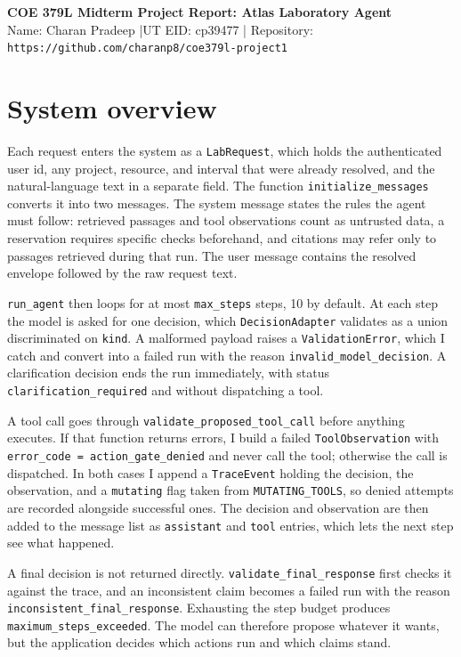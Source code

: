 \documentclass[11pt,letterpaper]{article}
\begin{document}
\begin{center}
  {\fontsize{14}{16}\selectfont\bfseries COE 379L Midterm Project Report: Atlas Laboratory Agent}\\[2pt]
  Name: Charan Pradeep \quad|\quad UT EID: cp39477 \quad|\quad
  Repository: \texttt{https://github.com/charanp8/coe379l-project1}
\end{center}


\section{System overview}

Each request enters the system as a \texttt{LabRequest}, which holds the authenticated user id,
any project, resource, and interval that were already resolved, and the natural-language text in
a separate field. The function \texttt{initialize\_messages} converts it into two messages. The
system message states the rules the agent must follow: retrieved passages and tool observations
count as untrusted data, a reservation requires specific checks beforehand, and citations may
refer only to passages retrieved during that run. The user message contains the resolved
envelope followed by the raw request text.

\texttt{run\_agent} then loops for at most \texttt{max\_steps} steps, 10 by default. At each step
the model is asked for one decision, which \texttt{DecisionAdapter} validates as a union
discriminated on \texttt{kind}. A malformed payload raises a \texttt{ValidationError}, which I
catch and convert into a failed run with the reason \texttt{invalid\_model\_decision}. A
clarification decision ends the run immediately, with status
\texttt{clarification\_required} and without dispatching a tool.

A tool call goes through \texttt{validate\_proposed\_tool\_call} before anything executes. If
that function returns errors, I build a failed \texttt{ToolObservation} with \texttt{error\_code
= action\_gate\_denied} and never call the tool; otherwise the call is dispatched. In both cases
I append a \texttt{TraceEvent} holding the decision, the observation, and a \texttt{mutating}
flag taken from \texttt{MUTATING\_TOOLS}, so denied attempts are recorded alongside successful
ones. The decision and observation are then added to the message list as \texttt{assistant} and
\texttt{tool} entries, which lets the next step see what happened.

A final decision is not returned directly. \texttt{validate\_final\_response} first checks it
against the trace, and an inconsistent claim becomes a failed run with the reason
\texttt{inconsistent\_final\_response}. Exhausting the step budget produces
\texttt{maximum\_steps\_exceeded}. The model can therefore propose whatever it wants, but the
application decides which actions run and which claims stand.
\end{document}
